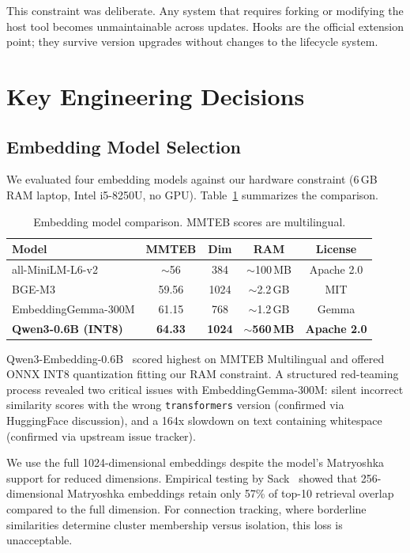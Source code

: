 \documentclass[11pt,a4paper]{article}
\begin{document}
This constraint was deliberate.
Any system that requires forking or modifying the host tool becomes unmaintainable across updates.
Hooks are the official extension point; they survive version upgrades without changes to the lifecycle system.


\section{Key Engineering Decisions}

\subsection{Embedding Model Selection}

We evaluated four embedding models against our hardware constraint (6\,GB RAM laptop, Intel i5-8250U, no GPU).
Table~\ref{tab:embeddings} summarizes the comparison.

\begin{table}[h]
\centering
\caption{Embedding model comparison. MMTEB scores are multilingual.}
\label{tab:embeddings}
\small
\begin{tabular}{lcccc}
\toprule
\textbf{Model} & \textbf{MMTEB} & \textbf{Dim} & \textbf{RAM} & \textbf{License} \\
\midrule
all-MiniLM-L6-v2 & $\sim$56 & 384 & $\sim$100\,MB & Apache 2.0 \\
BGE-M3 & 59.56 & 1024 & $\sim$2.2\,GB & MIT \\
EmbeddingGemma-300M & 61.15 & 768 & $\sim$1.2\,GB & Gemma \\
\textbf{Qwen3-0.6B (INT8)} & \textbf{64.33} & \textbf{1024} & \textbf{$\sim$560\,MB} & \textbf{Apache 2.0} \\
\bottomrule
\end{tabular}
\end{table}

Qwen3-Embedding-0.6B~\cite{qwen3embedding} scored highest on MMTEB Multilingual and offered ONNX INT8 quantization fitting our RAM constraint.
A structured red-teaming process revealed two critical issues with EmbeddingGemma-300M: silent incorrect similarity scores with the wrong \texttt{transformers} version (confirmed via HuggingFace discussion), and a 164x slowdown on text containing whitespace (confirmed via upstream issue tracker).

We use the full 1024-dimensional embeddings despite the model's Matryoshka support for reduced dimensions.
Empirical testing by Sack~\cite{matryoshkawarning} showed that 256-dimensional Matryoshka embeddings retain only 57\% of top-10 retrieval overlap compared to the full dimension.
For connection tracking, where borderline similarities determine cluster membership versus isolation, this loss is unacceptable.
\end{document}

